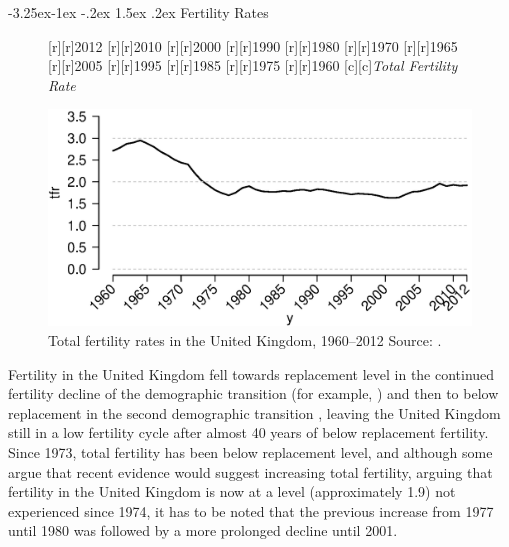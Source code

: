 \documentclass[11 pt, a4paper]{report}
\makeatletter
\renewcommand\subsection{\@startsection{subsection}{2}{\z@}%
                                     {-3.25ex\@plus -1ex \@minus -.2ex}%
                                     {1.5ex \@plus .2ex}%
    								{\large\scshape}}
\makeatother
\begin{document}
\clearpage
\subsection{Fertility Rates}

\begin{figure}[hbtp!]
[r][r]{\small{2012}}
[r][r]{\small{2010}}
[r][r]{\small{2000}}
[r][r]{\small{1990}}
[r][r]{\small{1980}}
[r][r]{\small{1970}}
[r][r]{\small{1965}}
[r][r]{\small{2005}}
[r][r]{\small{1995}}
[r][r]{\small{1985}}
[r][r]{\small{1975}}
[r][r]{\small{1960}}
[c][c]{\normalsize{\emph{Total Fertility Rate}}}

\includegraphics[width=\textwidth]{../figures/Fig1.2.eps}
\caption{Total fertility rates in the United Kingdom, 1960--2012 Source: \citet{ONS2014}.}
\label{Fig:03}
\end{figure}

Fertility in the United Kingdom fell towards replacement level in the continued fertility decline of the demographic transition (for example, \citet{Kirk1996}) and then to below replacement in the second demographic transition \citep{vdKaa1987}, leaving the United Kingdom still in a low fertility cycle after almost 40 years of below replacement fertility. Since 1973, total fertility has been below replacement level, and although some argue that recent evidence would suggest increasing total fertility, arguing that fertility in the United Kingdom is now at a level (approximately 1.9) not experienced since 1974, it has to be noted that the previous increase from 1977 until 1980 was followed by a more prolonged decline until 2001. 
\end{document}
